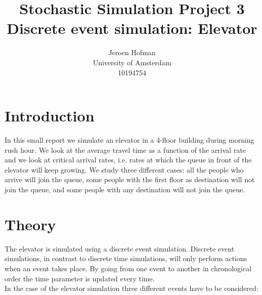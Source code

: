 \documentclass[10pt,a4paper]{article}
\begin{document}
\captionsetup{width=0.8\textwidth}

\author{Jeroen Hofman\\
  University of Amsterdam \\
  		10194754\\
		}
\title{Stochastic Simulation Project 3\\
       Discrete event simulation: Elevator
		}
\maketitle

\newpage

\section{Introduction}
In this small report we simulate an elevator in a 4-floor building during morning rush hour. We look at the average travel time as a function of the arrival rate and we look at critical arrival rates, i.e. rates at which the queue in front of the elevator will keep growing. We study three different cases: all the people who arrive will join the queue, some people with the first floor as destination will not join the queue, and some people with any destination will not join the queue.

\section{Theory}
The elevator is simulated using a discrete event simulation. Discrete event simulations, in contrast to discrete time simulations, will only perform actions when an event takes place. By going from one event to another in chronological order the time parameter is updated every time.\\
\noindent In the case of the elevator simulation three different events have to be considered: 
\end{document}
